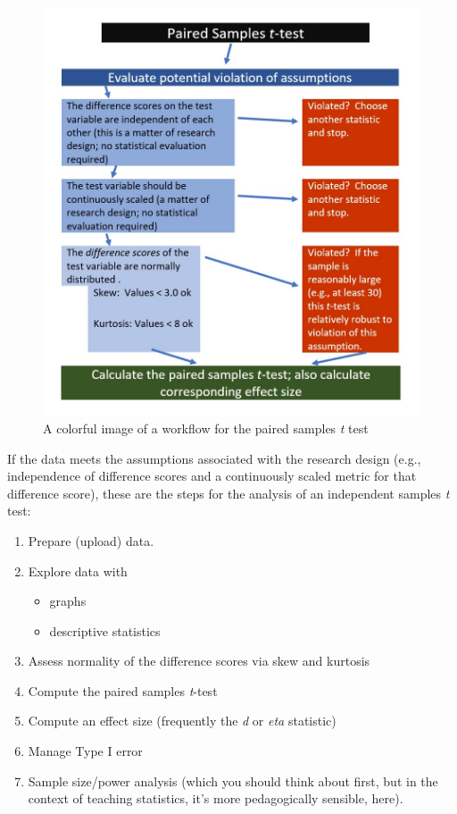 \documentclass[
  11pt,
]{book}
\providecommand{\tightlist}{%
  \setlength{\itemsep}{0pt}\setlength{\parskip}{0pt}}
\begin{document}
\begin{figure}
\centering
\includegraphics{images/ttests/PairedSampleWrkFlw.jpg}
\caption{A colorful image of a workflow for the paired samples \emph{t} test}
\end{figure}

If the data meets the assumptions associated with the research design (e.g., independence of difference scores and a continuously scaled metric for that difference score), these are the steps for the analysis of an independent samples \emph{t} test:

\begin{enumerate}
\def\labelenumi{\arabic{enumi}.}
\tightlist
\item
  Prepare (upload) data.
\item
  Explore data with

  \begin{itemize}
  \tightlist
  \item
    graphs
  \item
    descriptive statistics
  \end{itemize}
\item
  Assess normality of the difference scores via skew and kurtosis
\item
  Compute the paired samples \emph{t}-test
\item
  Compute an effect size (frequently the \emph{d} or \emph{eta} statistic)
\item
  Manage Type I error
\item
  Sample size/power analysis (which you should think about first, but in the context of teaching statistics, it's more pedagogically sensible, here).
\end{enumerate}
\end{document}
